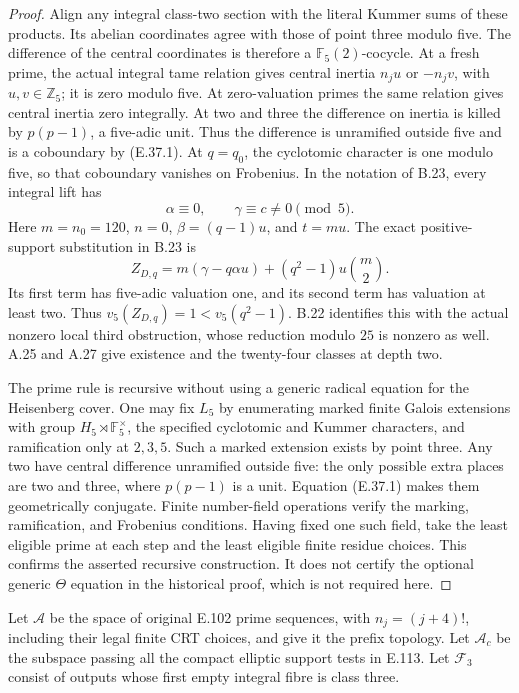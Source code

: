 \begin{proof}
Align any integral class-two section with the literal
Kummer sums of these products. Its abelian coordinates
agree with those of point three modulo five.
The difference of the central coordinates is therefore
a $\mathbb F_5(2)$-cocycle. At a fresh prime, the
actual integral tame relation gives central inertia
$n_ju$ or $-n_jv$, with $u,v\in\mathbb Z_5$;
it is zero modulo five. At zero-valuation primes
the same relation gives central inertia zero
integrally. At two and three the difference on
inertia is killed by $p(p-1)$, a five-adic unit.
Thus the difference is unramified outside five
and is a coboundary by (E.37.1).
At $q=q_0$, the cyclotomic character is one modulo
five, so that coboundary vanishes on Frobenius.
In the notation of B.23, every integral lift has
\[
 \alpha\equiv0,\qquad\gamma\equiv c\ne0\pmod5.
\]
Here $m=n_0=120$, $n=0$, $\beta=(q-1)u$, and
$t=mu$. The exact positive-support substitution in
B.23 is
\[
 Z_{D,q}=m(\gamma-q\alpha u)
          +(q^2-1)u\binom m2 .
 \tag{E.60.2}
\]
Its first term has five-adic valuation one, and
its second term has valuation at least two.
Thus $v_5(Z_{D,q})=1<v_5(q^2-1)$.
B.22 identifies this with the actual nonzero local
third obstruction, whose reduction modulo $25$
is nonzero as well. A.25 and A.27 give existence
and the twenty-four classes at depth two.

The prime rule is recursive without using a generic
radical equation for the Heisenberg cover. One may
fix $L_5$ by enumerating marked finite Galois
extensions with group $H_5\rtimes\mathbb F_5^\times$,
the specified cyclotomic and Kummer characters,
and ramification only at $2,3,5$.
Such a marked extension exists by point three.
Any two have central difference unramified outside
five: the only possible extra places are two
and three, where $p(p-1)$ is a unit. Equation
(E.37.1) makes them geometrically conjugate.
Finite number-field operations verify the marking,
ramification, and Frobenius conditions. Having
fixed one such field, take the least eligible prime
at each step and the least eligible finite residue
choices. This confirms the asserted recursive
construction. It does not certify the optional
generic $\Theta$ equation in the historical proof,
which is not required here.
\end{proof}

Let $\mathscr A$ be the space of original E.102
prime sequences, with $n_j=(j+4)!$, including
their legal finite CRT choices, and give it the
prefix topology. Let $\mathscr A_c$ be the
subspace passing all the compact elliptic support
tests in E.113. Let $\mathscr F_3$ consist of
outputs whose first empty integral fibre is class
three.


